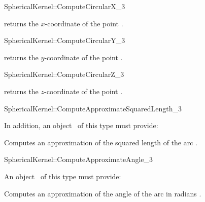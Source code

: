 \begin{ccRefFunctionObjectConcept}{SphericalKernel::ComputeCircularX_3}


       {returns the $x$-coordinate of the point .}

\end{ccRefFunctionObjectConcept}
\begin{ccRefFunctionObjectConcept}{SphericalKernel::ComputeCircularY_3}


       {returns the $y$-coordinate of the point .}

\end{ccRefFunctionObjectConcept}
\begin{ccRefFunctionObjectConcept}{SphericalKernel::ComputeCircularZ_3}


       {returns the $z$-coordinate of the point .}

\end{ccRefFunctionObjectConcept}

\begin{ccRefFunctionObjectConcept}{SphericalKernel::ComputeApproximateSquaredLength_3}

\ccRefines



In addition, an object \ccVar\ of this type must provide:

{Computes an approximation of the squared length of the arc .}

\end{ccRefFunctionObjectConcept}
\begin{ccRefFunctionObjectConcept}{SphericalKernel::ComputeApproximateAngle_3}

An object \ccVar\ of this type must provide:

{Computes an approximation of the angle of the arc in radians .}

\end{ccRefFunctionObjectConcept}
